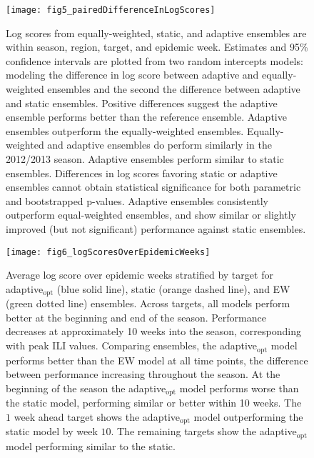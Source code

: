 \documentclass[sagev,times,Review,10pt]{sagej}
\begin{document}
\graphicspath{{../../../_6_TLGs/_G/fig5_pairedDifferenceInLogScores/}}
\begin{figure}[ht!]
  \centering
  \texttt{[image: fig5\_pairedDifferenceInLogScores]}
  \caption{
    Log scores from equally-weighted, static, and adaptive ensembles are within season, region, target, and epidemic week.
    Estimates and 95\% confidence intervals are plotted from two random intercepts models: modeling the difference in log score between adaptive and equally-weighted ensembles and the second the difference between adaptive and static ensembles.
    Positive differences suggest the adaptive ensemble performs better than the reference ensemble.
    Adaptive ensembles outperform the equally-weighted ensembles.
    Equally-weighted and adaptive ensembles do perform similarly in the 2012/2013 season.
    Adaptive ensembles perform similar to static ensembles.
    Differences in log scores favoring static or adaptive ensembles cannot obtain statistical significance for both parametric and bootstrapped p-values.
    Adaptive ensembles consistently outperform equal-weighted ensembles, and show similar or slightly improved (but not significant) performance against static ensembles.
    \label{fig5.pairedLogScoreDifferences}}
\end{figure}

\graphicspath{{../../../_6_TLGs/_G/fig6_logScoresByEpidemicWeek/}}
\begin{figure}[ht!]
    \centering
    \texttt{[image: fig6\_logScoresOverEpidemicWeeks]}
    \caption{
    Average log score over epidemic weeks stratified by target for adaptive$_{\mathrm{opt}}$ (blue solid line), static (orange dashed line), and EW (green dotted line) ensembles.
    Across targets, all models perform better at the beginning and end of the season.
    Performance decreases at approximately 10 weeks into the season, corresponding with peak ILI values.
    Comparing ensembles, the adaptive$_{\mathrm{opt}}$ model performs better than the EW model at all time points, the difference between performance increasing throughout the season.
    At the beginning of the season the adaptive$_{\mathrm{opt}}$ model performs worse than the static model, performing similar or better within 10 weeks. 
    The $1$ week ahead target shows the adaptive$_{\mathrm{opt}}$ model outperforming the static model by week $10$.
    The remaining targets show the adaptive$_{\mathrm{opt}}$ model performing similar to the static.
    \label{fig6.logScoresOverEpidemicWeeks}}
\end{figure}
\end{document}
